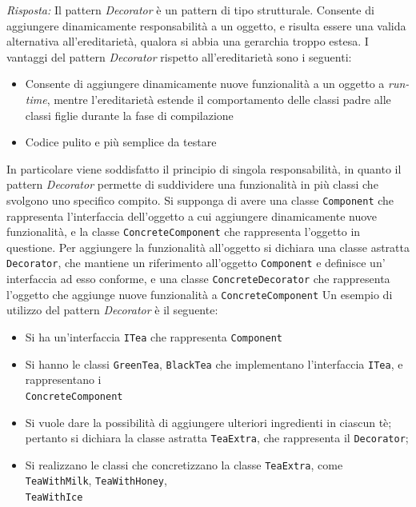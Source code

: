 \documentclass{article}
\newenvironment{solution}
    {\textit{Risposta:}}
    {}
\begin{document}
\begin{solution}
Il pattern \textit{Decorator} è un pattern di tipo strutturale.
Consente di aggiungere dinamicamente responsabilità a un oggetto, e risulta essere una valida alternativa all'ereditarietà, qualora si abbia una gerarchia troppo estesa.
I vantaggi del pattern \textit{Decorator} rispetto all'ereditarietà sono i seguenti:
\begin{itemize}
	\item Consente di aggiungere dinamicamente nuove funzionalità a un oggetto a \textit{run-time}, mentre l'ereditarietà estende il comportamento delle classi padre alle classi figlie durante la fase di compilazione
	\item Codice pulito e più semplice da testare
\end{itemize}
In particolare viene soddisfatto il principio di singola responsabilità, in quanto il pattern \textit{Decorator} permette di suddividere una funzionalità in più classi che svolgono uno specifico compito.
\newline
Si supponga di avere una classe \texttt{Component} che rappresenta l'interfaccia dell'oggetto a cui aggiungere dinamicamente nuove funzionalità, e la classe \texttt{ConcreteComponent} che rappresenta l'oggetto in questione.
Per aggiungere la funzionalità all'oggetto si dichiara una classe astratta \texttt{Decorator}, che mantiene un riferimento all'oggetto \texttt{Component} e definisce un' interfaccia ad esso conforme, e una classe \texttt{ConcreteDecorator} che rappresenta l'oggetto che aggiunge nuove funzionalità a \texttt{ConcreteComponent}
Un esempio di utilizzo del pattern \textit{Decorator} è il seguente:
\begin{itemize}
\item Si ha un'interfaccia \texttt{ITea} che rappresenta \texttt{Component}
\item Si hanno le classi \texttt{GreenTea}, \texttt{BlackTea} che implementano l'interfaccia \texttt{ITea}, e rappresentano i
\\
\texttt{ConcreteComponent}
\item Si vuole dare la possibilità di aggiungere ulteriori ingredienti in ciascun tè; pertanto si dichiara la classe astratta \texttt{TeaExtra}, che rappresenta il \texttt{Decorator};
\item Si realizzano le classi che concretizzano la classe \texttt{TeaExtra}, come \texttt{TeaWithMilk}, \texttt{TeaWithHoney},
\\
\texttt{TeaWithIce}
\end{itemize}
\end{solution}
\end{document}
